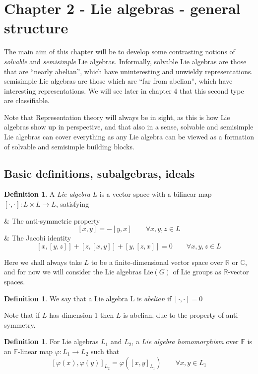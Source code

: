 \documentclass[]{report}
\theoremstyle{plain}
\theoremstyle{definition}
\newtheorem{defn}[thm]{Definition} %
\begin{document}
\section{Chapter 2 - Lie algebras - general structure}
The main aim of this chapter will be to develop some contrasting notions of \emph{solvable} and \emph{semisimple} Lie algebras. Informally, solvable Lie algebras are those that are ``nearly abelian'', which have uninteresting and unwieldy representations. semisimple Lie algebras are those which are ``far from abelian'', which have interesting representations. We will see later in chapter 4 that this second type are classifiable.

Note that Representation theory will always be in sight, as this is how Lie algebras show up in perspective, and that also in a sense, solvable and semisimple Lie algebras can cover everything as any Lie algebra can be viewed as a formation of solvable and semisimple building blocks.

\subsection{Basic definitions, subalgebras, ideals}

\begin{defn}
	A \emph{Lie algebra} $L$ is a vector space with a bilinear map \\ $[\cdot, \cdot] : L \times L \to L$, satisfying 
	
	\begin{easylist}[enumerate]
		& The anti-symmetric property
		\[ [x,y] = -[y,x] \qquad \forall x,y,z \in L \]
		& The Jacobi identity
		\[ [x,[y,z]] + [z,[x,y]] + [y,[z,x]] = 0 \qquad \forall x,y,z \in L \]
	\end{easylist}
\end{defn} 

Here we shall always take $L$ to be a finite-dimensional vector space over $\mathbb{R}$ or $\mathbb{C}$, and for now we will consider the Lie algebras Lie$(G)$ of Lie groups as $\mathbb{R}$-vector spaces.

\begin{defn}
	We say that a Lie algebra L is \emph{abelian} if $[\cdot,\cdot] = 0$
\end{defn}


Note that if $L$ has dimension 1 then $L$ is abelian, due to the property of anti-symmetry.

\begin{defn}
	For Lie algebras $L_1$ and $L_2$, a \emph{Lie algebra homomorphism} over $\mathbb{F}$ is an $\mathbb{F}$-linear map $\varphi : L_1 \to L_2$ such that
		\[ [\varphi(x), \varphi(y)]_{L_2} = \varphi([x,y]_{L_1}) \qquad \forall x,y \in L_1 \]
\end{defn}
\end{document}
